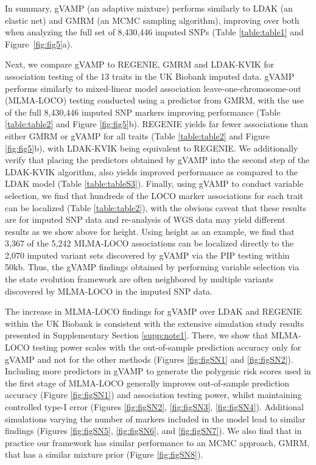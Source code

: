 In summary, gVAMP (an adaptive mixture) performs similarly to LDAK (an elastic net) and GMRM (an MCMC sampling algorithm), improving over both when analyzing the full set of 8,430,446 imputed SNPs (Table \ref{table:table1} and Figure~\ref{fig:fig5}a).  

Next, we compare gVAMP to REGENIE, GMRM and LDAK-KVIK for association testing of the 13 traits in the UK Biobank imputed data. gVAMP performs similarly to mixed-linear model association leave-one-chromosome-out (MLMA-LOCO) testing conducted using a predictor from GMRM, with the use of the full 8,430,446 imputed SNP markers improving performance (Table \ref{table:table2} and Figure \ref{fig:fig5}b). REGENIE yields far fewer associations than either GMRM or gVAMP for all traits (Table \ref{table:table2} and Figure \ref{fig:fig5}b), with LDAK-KVIK being equivalent to REGENIE. We additionally verify that placing the predictors obtained by gVAMP into the second step of the LDAK-KVIK algorithm, also yields improved performance as compared to the LDAK model (Table \ref{table:tableS3}). Finally, using gVAMP to conduct variable selection, we find that hundreds of the LOCO marker associations for each trait can be localized (Table \ref{table:table2}), with the obvious caveat that these results are for imputed SNP data and re-analysis of WGS data may yield different results as we show above for height. Using height as an example, we find that 3,367 of the 5,242 MLMA-LOCO associations can be localized directly to the 2,070 imputed variant sets discovered by gVAMP via the PIP testing within 50kb. Thus, the gVAMP findings obtained by performing variable selection via the state evolution framework are often neighbored by multiple variants discovered by MLMA-LOCO in the imputed SNP data.

The increase in MLMA-LOCO findings for gVAMP over LDAK and REGENIE within the UK Biobank is consistent with the extensive simulation study results presented in Supplementary Section \ref{supp:note1}. There, we show that MLMA-LOCO testing power scales with the out-of-sample prediction accuracy only for gVAMP and not for the other methods (Figures \ref{fig:figSN1} and \ref{fig:figSN2}). Including more predictors in gVAMP to generate the polygenic risk scores used in the first stage of MLMA-LOCO generally improves out-of-sample prediction accuracy (Figure \ref{fig:figSN1}) and association testing power, whilst maintaining controlled type-I error (Figures \ref{fig:figSN2}, \ref{fig:figSN3}, \ref{fig:figSN4}). Additional simulations varying the number of markers included in the model lead to similar findings (Figures \ref{fig:figSN5}, \ref{fig:figSN6}, and \ref{fig:figSN7}). We also find that in practice our framework has similar performance to an MCMC approach, GMRM\cite{Orliac2022}, that has a similar mixture prior (Figure \ref{fig:figSN8}). 

